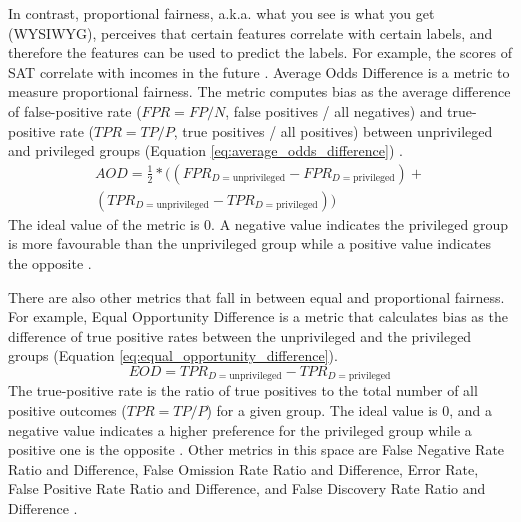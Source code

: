\documentclass[sigconf,review]{acmart}
\begin{document}
	In contrast, proportional fairness, a.k.a. what you see is what you get (WYSIWYG),  perceives that certain features correlate with certain labels, and therefore the features can be used to predict the labels. For example, the scores of SAT correlate with incomes in the future \cite{mahoney2020ai,ibmaif3602022guidance}. Average Odds Difference is a metric to measure proportional fairness. The metric computes bias as the average difference of false-positive rate ($FPR = FP/N$, false positives / all negatives) and true-positive rate ($TPR = TP/P$, true positives / all positives) between unprivileged and privileged groups (Equation \ref{eq:average_odds_difference}) \cite{ibmaif3602022doc,bellamy2018ai}.
	\begin{equation} \label{eq:average_odds_difference}
		\begin{aligned}
			AOD = \tfrac{1}{2}* ((FPR_{D = \text{unprivileged}} - FPR_{D = \text{privileged}}) +\\
			(TPR_{D = \text{unprivileged}} - TPR_{D = \text{privileged}}))
		\end{aligned}
	\end{equation}
	The ideal value of the metric is 0. A negative value indicates the privileged group is more favourable than the unprivileged group while a positive value indicates the opposite \cite{ibmaif3602022doc,bellamy2018ai}. 
	
	There are also other metrics that fall in between equal and proportional fairness. For example, Equal Opportunity Difference \cite{ibmaif3602022doc,bellamy2018ai} is a metric that calculates bias as the difference of true positive rates between the unprivileged and the privileged groups (Equation \ref{eq:equal_opportunity_difference}). 
	\begin{equation} \label{eq:equal_opportunity_difference}
		EOD = TPR_{D = \text{unprivileged}} - TPR_{D = \text{privileged}}	
	\end{equation}
	The true-positive rate is the ratio of true positives to the total number of all positive outcomes ($TPR=TP/P$) for a given group. The ideal value is 0, and a negative value indicates a higher preference for the privileged group while a positive one is the opposite \cite{ibmaif3602022doc,bellamy2018ai}. Other metrics in this space are False Negative Rate Ratio and Difference, False Omission Rate Ratio and Difference, Error Rate, False Positive Rate Ratio and Difference, and False Discovery Rate Ratio and Difference \cite{mahoney2020ai,ibmaif3602022guidance}.
	
\end{document}
